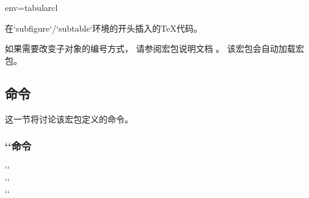 \begin{tableobject}{env=tabular}{cl}

  在`subfigure`\slash `subtable`环境的开头插入的\TeX{}代码。
\endkeydoc

如果需要改变子对象的编号方式，
请参阅宏包说明文档
\autocite[第5节 ]{subcaption}。
该宏包会自动加载宏包。
\endgroup


\subsection{命令}
\label{commands}

这一节将讨论该宏包定义的命令。


\subsubsection{``命令}
\label{includegraphicobject-command}
\begingroup
{}
`` \\
`` \\
``


\end{tableobject}
